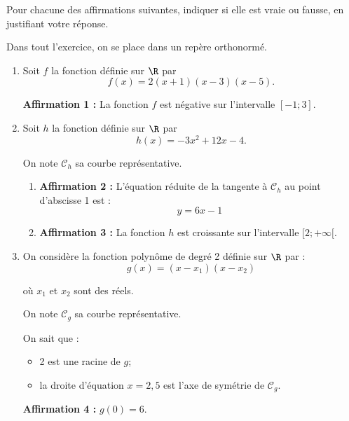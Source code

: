 Pour chacune des affirmations suivantes, indiquer si elle est vraie ou fausse, en justifiant votre réponse.

	Dans tout l'exercice, on se place dans un repère orthonormé.

	\begin{enumerate}[itemsep=5mm]
		\item Soit $f$ la fonction définie sur $\R$ par \[f(x)=2(x+1)(x-3)(x-5).\]

		\textbf{Affirmation 1 :} La fonction $f$ est négative sur l'intervalle $[-1 ; 3]$.

		\item Soit $h$ la fonction définie sur $\R$ par
		\[h(x)=-3 x^{2}+12 x-4.\]

		On note $\mathcal{C}_{h}$ sa courbe représentative.

		\begin{enumerate}
			\item \textbf{Affirmation 2 :} L'équation réduite de la tangente à $\mathcal{C}_{h}$ au point d'abscisse 1 est :
			\[y=6 x-1\]

			\item \textbf{Affirmation 3 :} La fonction $h$ est croissante sur l'intervalle $[2 ; +\infty[$.
		\end{enumerate}

		\item On considère la fonction polynôme de degré 2 définie sur $\R$ par :
		\[g(x)=\left(x-x_{1}\right)\left(x-x_{2}\right)\]

		où $x_{1}$ et $x_{2}$ sont des réels.

		On note $\mathcal{C}_{g}$ sa courbe représentative.

		On sait que :

		\begin{itemize}[label={\textbullet~}]
			\item 2 est une racine de $g$;
			\item la droite d'équation $x=2,5$ est l'axe de symétrie de $\mathcal{C}_{g}$.
		\end{itemize}

		\textbf{Affirmation 4 :} $g(0)=6$.

	\end{enumerate}
